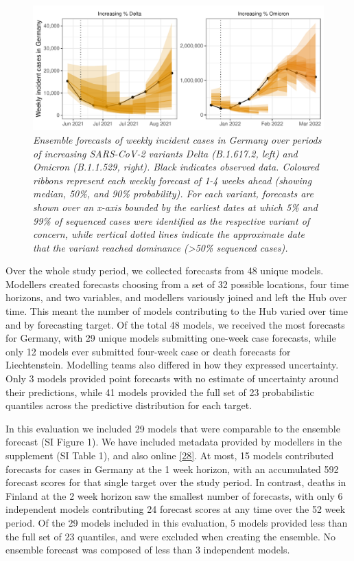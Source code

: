 \documentclass[
]{article}
\begin{document}
\begin{figure}
\centering
\includegraphics{latest_files/figure-latex/example-ensemble-1.pdf}
\caption{\label{fig:example-ensemble}\emph{Ensemble forecasts of weekly incident cases in Germany over periods of increasing SARS-CoV-2 variants Delta (B.1.617.2, left) and Omicron (B.1.1.529, right). Black indicates observed data. Coloured ribbons represent each weekly forecast of 1-4 weeks ahead (showing median, 50\%, and 90\% probability). For each variant, forecasts are shown over an x-axis bounded by the earliest dates at which 5\% and 99\% of sequenced cases were identified as the respective variant of concern, while vertical dotted lines indicate the approximate date that the variant reached dominance (\textgreater50\% sequenced cases).}}
\end{figure}

Over the whole study period, we collected forecasts from 48 unique models. Modellers created forecasts choosing from a set of 32 possible locations, four time horizons, and two variables, and modellers variously joined and left the Hub over time. This meant the number of models contributing to the Hub varied over time and by forecasting target. Of the total 48 models, we received the most forecasts for Germany, with 29 unique models submitting one-week case forecasts, while only 12 models ever submitted four-week case or death forecasts for Liechtenstein. Modelling teams also differed in how they expressed uncertainty. Only 3 models provided point forecasts with no estimate of uncertainty around their predictions, while 41 models provided the full set of 23 probabilistic quantiles across the predictive distribution for each target.

In this evaluation we included 29 models that were comparable to the ensemble forecast (SI Figure 1). We have included metadata provided by modellers in the supplement (SI Table 1), and also online \protect\hyperlink{ref-katharine_sherratt_2022_7356267}{{[}28{]}}. At most, 15 models contributed forecasts for cases in Germany at the 1 week horizon, with an accumulated 592 forecast scores for that single target over the study period. In contrast, deaths in Finland at the 2 week horizon saw the smallest number of forecasts, with only 6 independent models contributing 24 forecast scores at any time over the 52 week period. Of the 29 models included in this evaluation, 5 models provided less than the full set of 23 quantiles, and were excluded when creating the ensemble. No ensemble forecast was composed of less than 3 independent models.
\end{document}
